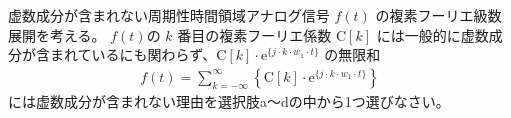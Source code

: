 虚数成分が含まれない周期性時間領域アナログ信号 $f(t)$ の複素フーリエ級数展開を考える。
$f(t)$の $k$ 番目の複素フーリエ係数 $\textrm{C}[k]$ には一般的に虚数成分が含まれているにも関わらず、$\textrm{C}[k] \cdot \textrm{e}^{\{j \cdot k \cdot w_1 \cdot t \}} $ の無限和
\begin{align*}
f(t) = \sum_{k = -\infty}^{\infty} 
\left \{
\textrm{C}[k] \cdot \textrm{e}^{\{j \cdot k \cdot w_1 \cdot t \}}
\right \}
\end{align*}
には虚数成分が含まれない理由を選択肢a〜dの中から1つ選びなさい。
